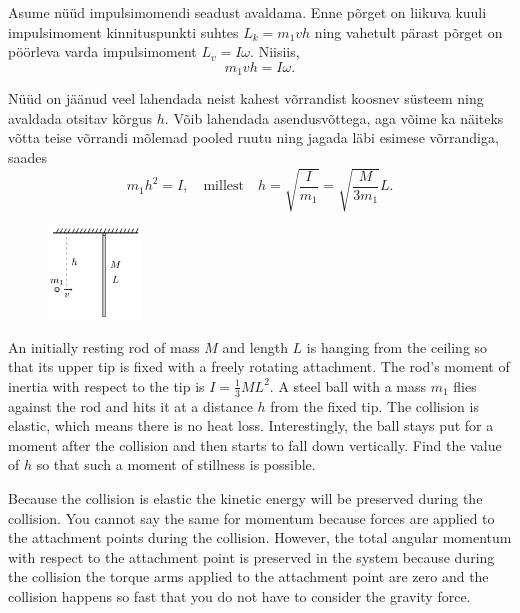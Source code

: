 {Asume nüüd impulsimomendi seadust avaldama. Enne põrget on liikuva kuuli impulsimoment kinnituspunkti suhtes $L_k=m_1vh$ ning vahetult pärast põrget on pöörleva varda impulsimoment $L_v=I\omega$. Niisiis,
\[
m_1vh=I\omega.
\]

Nüüd on jäänud veel lahendada neist kahest võrrandist koosnev süsteem ning avaldada otsitav kõrgus $h$. Võib lahendada asendusvõttega, aga võime ka näiteks võtta teise võrrandi mõlemad pooled ruutu ning jagada läbi esimese võrrandiga, saades
\[
m_1h^2 = I,\quad \text{millest} \quad h = \sqrt{\frac{I}{m_1}}=\sqrt{\frac{M}{3m_1}}L.
\]
\fi


\ifEngStatement
\begin{figure}
\includegraphics[width=0.22\textwidth]{2015-v2g-06-porgejoonis}
\end{figure}
An initially resting rod of mass $M$ and length $L$ is hanging from the ceiling so that its upper tip is fixed with a freely rotating attachment. The rod’s moment of inertia with respect to the tip is $I=\frac{1}{3}ML^2$. A steel ball with a mass $m_1$ flies against the rod and hits it at a distance $h$ from the fixed tip. The collision is elastic, which means there is no heat loss. Interestingly, the ball stays put for a moment after the collision and then starts to fall down vertically. Find the value of $h$ so that such a moment of stillness is possible.
\fi


\ifEngHint
Because the collision is elastic the kinetic energy will be preserved during the collision. You cannot say the same for momentum because forces are applied to the attachment points during the collision. However, the total angular momentum with respect to the attachment point is preserved in the system because during the collision the torque arms applied to the attachment point are zero and the collision happens so fast that you do not have to consider the gravity force.
\fi


}
